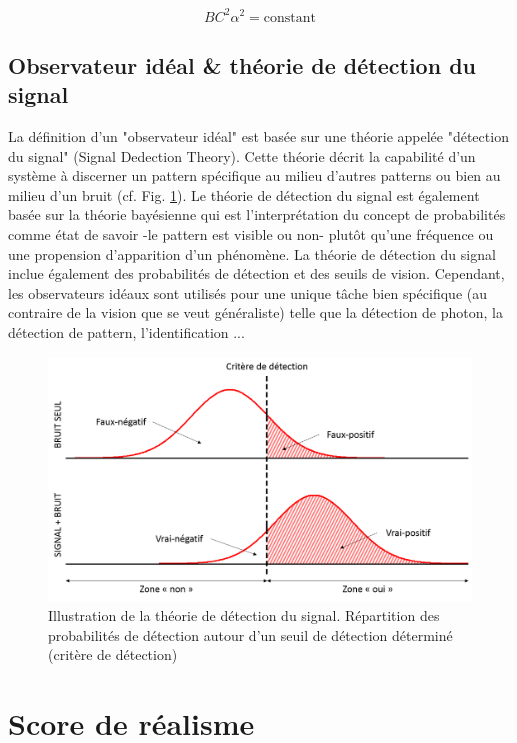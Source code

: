 		\begin{equation}
			BC^2\alpha^2 = \text{constant}
			\label{eq:modèle_rose} 
		\end{equation}
		
		\section*{Observateur idéal \& théorie de détection du signal}		
		\par La définition d'un "observateur idéal" est basée sur une théorie appelée "détection du signal" (Signal Dedection Theory). Cette théorie décrit la capabilité d'un système à discerner un pattern spécifique au milieu d'autres patterns ou bien au milieu d'un bruit (cf. Fig. \ref{fig:signal_detection_theory}). Le théorie de détection du signal est également basée sur la théorie bayésienne qui est l'interprétation du concept de probabilités comme état de savoir -le pattern est visible ou non- plutôt qu'une fréquence ou une propension d'apparition d'un phénomène. La théorie de détection du signal inclue également des probabilités de détection et des seuils de vision. Cependant, les observateurs idéaux sont utilisés pour une unique tâche bien spécifique (au contraire de la vision que se veut généraliste) telle que la détection de photon, la détection de pattern, l'identification ...
		
		\begin{figure}
			\centering
			\includegraphics[scale=.5]{Figures/SignalDetectionTheory}
			\caption{Illustration de la théorie de détection du signal. Répartition des probabilités de détection autour d'un seuil de détection déterminé (critère de détection)}
			\label{fig:signal_detection_theory}
		\end{figure}
	
	\chapter{Score de réalisme}
